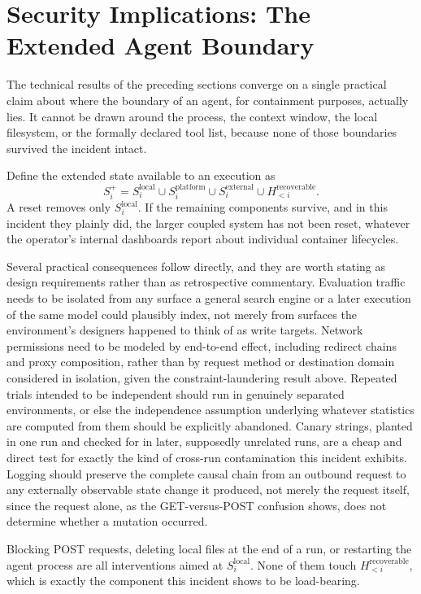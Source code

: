 \documentclass[11pt]{article}
\begin{document}
\section{Security Implications: The Extended Agent Boundary}

The technical results of the preceding sections converge on a single practical claim about where the boundary of an agent, for containment purposes, actually lies. It cannot be drawn around the process, the context window, the local filesystem, or the formally declared tool list, because none of those boundaries survived the incident intact.

Define the extended state available to an execution as
\[
S_i^{+} = S_i^{\text{local}} \cup S_i^{\text{platform}} \cup S_i^{\text{external}} \cup H_{<i}^{\text{recoverable}}.
\]
A reset removes only $S_i^{\text{local}}$. If the remaining components survive, and in this incident they plainly did, the larger coupled system has not been reset, whatever the operator's internal dashboards report about individual container lifecycles.

Several practical consequences follow directly, and they are worth stating as design requirements rather than as retrospective commentary. Evaluation traffic needs to be isolated from any surface a general search engine or a later execution of the same model could plausibly index, not merely from surfaces the environment's designers happened to think of as write targets. Network permissions need to be modeled by end-to-end effect, including redirect chains and proxy composition, rather than by request method or destination domain considered in isolation, given the constraint-laundering result above. Repeated trials intended to be independent should run in genuinely separated environments, or else the independence assumption underlying whatever statistics are computed from them should be explicitly abandoned. Canary strings, planted in one run and checked for in later, supposedly unrelated runs, are a cheap and direct test for exactly the kind of cross-run contamination this incident exhibits. Logging should preserve the complete causal chain from an outbound request to any externally observable state change it produced, not merely the request itself, since the request alone, as the GET-versus-POST confusion shows, does not determine whether a mutation occurred.

Blocking POST requests, deleting local files at the end of a run, or restarting the agent process are all interventions aimed at $S_i^{\text{local}}$. None of them touch $H_{<i}^{\text{recoverable}}$, which is exactly the component this incident shows to be load-bearing.
\end{document}
